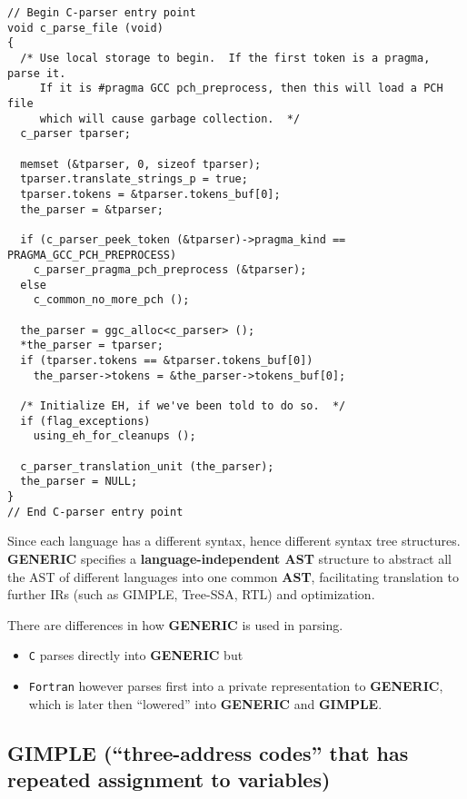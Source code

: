 \documentclass[11pt]{article}
\begin{document}
\begin{verbatim}
// Begin C-parser entry point
void c_parse_file (void)
{
  /* Use local storage to begin.  If the first token is a pragma, parse it.
     If it is #pragma GCC pch_preprocess, then this will load a PCH file
     which will cause garbage collection.  */
  c_parser tparser;

  memset (&tparser, 0, sizeof tparser);
  tparser.translate_strings_p = true;
  tparser.tokens = &tparser.tokens_buf[0];
  the_parser = &tparser;

  if (c_parser_peek_token (&tparser)->pragma_kind == PRAGMA_GCC_PCH_PREPROCESS)
    c_parser_pragma_pch_preprocess (&tparser);
  else
    c_common_no_more_pch ();

  the_parser = ggc_alloc<c_parser> ();
  *the_parser = tparser;
  if (tparser.tokens == &tparser.tokens_buf[0])
    the_parser->tokens = &the_parser->tokens_buf[0];

  /* Initialize EH, if we've been told to do so.  */
  if (flag_exceptions)
    using_eh_for_cleanups ();

  c_parser_translation_unit (the_parser);
  the_parser = NULL;
}
// End C-parser entry point
\end{verbatim}

Since each language has a different syntax, hence different syntax tree
structures. \textbf{GENERIC} specifies a \textbf{language-independent AST}
structure to abstract all the AST of different languages into one common
\textbf{AST}\cite{parsing-pass}, facilitating translation to further IRs (such
as GIMPLE, Tree-SSA, RTL) and optimization.

There are differences in how \textbf{GENERIC} is used in parsing.
\begin{itemize}
\item \texttt{C} parses directly into \textbf{GENERIC} but

\item \texttt{Fortran} however parses first into a private representation to \textbf{GENERIC},
which is later then ``lowered'' into \textbf{GENERIC} and \textbf{GIMPLE}\cite{passes}.
\end{itemize}

\subsection{GIMPLE (``three-address codes'' that has repeated assignment to variables)}
\label{sec:org1161d48}
\end{document}
